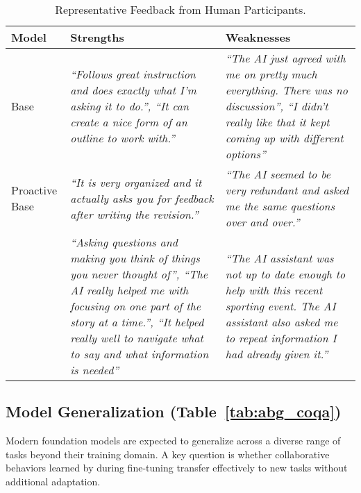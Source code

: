 \begin{table*}[t]
\centering
\vspace{-5pt}
\caption{Representative Feedback from Human Participants.}
\vspace{-10pt}
\begin{tabularx}{\textwidth}{|p{1.6cm}|X|X|}
    \hline
    \footnotesize \textbf{Model} & \footnotesize \textbf{Strengths} & \footnotesize \textbf{Weaknesses} \\
    \hline
    Base & \textit{``Follows great instruction and does exactly what I'm asking it to do.'', ``It can create a nice form of an outline to work with.''} & \textit{``The AI just agreed with me on pretty much everything. There was no discussion'', ``I didn't really like that it kept coming up with different options''} \\
    \hline
    Proactive Base & \textit{``It is very organized and it actually asks you for feedback after writing the revision.''} & \textit{``The AI seemed to be very redundant and asked me the same questions over and over.''} \\
    \hline
    \namewithspace{} & \textit{``Asking questions and making you think of things you never thought of'', ``The AI really helped me with focusing on one part of the story at a time.'', ``It helped really well to navigate what to say and what information is needed''} & \textit{``The AI assistant was not up to date enough to help with this recent sporting event.  The AI assistant also asked me to repeat information I had already given it.''} \\
    \hline
\end{tabularx}
\vspace{-5pt}
\label{tab:user_study}
\end{table*}

\subsection{Model Generalization (Table~\ref{tab:abg_coqa})}
\label{sec:generalization}
Modern foundation models are expected to generalize across a diverse range of tasks beyond their training domain. A key question is whether collaborative behaviors learned by \name{} during fine-tuning transfer effectively to new tasks without additional adaptation. 


